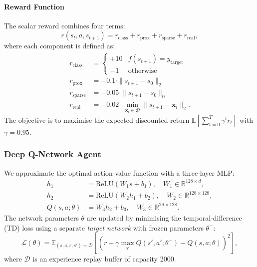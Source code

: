 \documentclass[conference]{IEEEtran}
\newcommand{\R}{\mathbb{R}}
\newcommand{\E}{\mathbb{E}}
\newcommand{\bx}{\mathbf{x}}
\begin{document}
\paragraph{Reward Function} The scalar reward combines four terms:
\begin{equation}
r(s_t,a,s_{t+1}) =
  r_\text{class} + r_\text{prox} + r_\text{sparse} + r_\text{real},
\label{eq:reward}
\end{equation}
where each component is defined as:
\begin{align}
r_\text{class}  &= \begin{cases}+10 & f(s_{t+1})=y_\text{target}\\ -1 & \text{otherwise}\end{cases} \label{eq:r_class}\\
r_\text{prox}   &= -0.1\cdot\|s_{t+1}-s_0\|_2  \label{eq:r_prox}\\
r_\text{sparse} &= -0.05\cdot\|s_{t+1}-s_0\|_0  \label{eq:r_sparse}\\
r_\text{real}   &= -0.02\cdot\min_{\bx_i\in\mathcal{D}}\|s_{t+1}-\bx_i\|_2. \label{eq:r_real}
\end{align}
The objective is to maximise the expected discounted return
$\E\!\left[\sum_{t=0}^{T}\gamma^t r_t\right]$ with $\gamma = 0.95$.

\subsubsection{Deep Q-Network Agent}

We approximate the optimal action-value function with a three-layer MLP:
\begin{align}
h_1 &= \text{ReLU}(W_1 s + b_1), \quad W_1 \in \R^{128\times d}, \label{eq:nn1}\\
h_2 &= \text{ReLU}(W_2 h_1 + b_2), \quad W_2 \in \R^{128\times 128}, \label{eq:nn2}\\
Q(s,a;\theta) &= W_3 h_2 + b_3, \quad W_3 \in \R^{2d\times 128}. \label{eq:nn3}
\end{align}
The network parameters $\theta$ are updated by minimising the temporal-difference
(TD) loss using a separate \emph{target network} with frozen parameters
$\theta^-$:
\begin{equation}
\mathcal{L}(\theta)=\E_{(s,a,r,s')\sim\mathcal{D}}\!
  \left[\!\left(r + \gamma\max_{a'}Q(s',a';\theta^-) - Q(s,a;\theta)\right)^{\!2}\right],
\label{eq:td_loss}
\end{equation}
where $\mathcal{D}$ is an experience replay buffer of capacity 2000.
\end{document}
